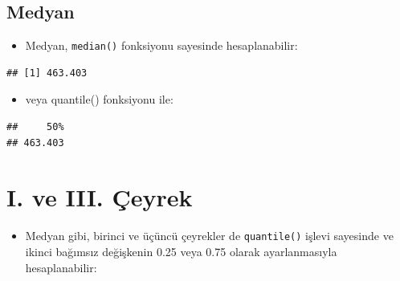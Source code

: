 \documentclass[
  oneside]{book}
\newenvironment{Shaded}{\begin{snugshade}}{\end{snugshade}}
\newcommand{\CommentTok}[1]{\textcolor[rgb]{0.56,0.35,0.01}{\textit{#1}}}
\newcommand{\FloatTok}[1]{\textcolor[rgb]{0.00,0.00,0.81}{#1}}
\newcommand{\FunctionTok}[1]{\textcolor[rgb]{0.13,0.29,0.53}{\textbf{#1}}}
\newcommand{\NormalTok}[1]{#1}
\newcommand{\SpecialCharTok}[1]{\textcolor[rgb]{0.81,0.36,0.00}{\textbf{#1}}}
\providecommand{\tightlist}{%
  \setlength{\itemsep}{0pt}\setlength{\parskip}{0pt}}
\begin{document}
\hypertarget{medyan}{%
\subsection{Medyan}\label{medyan}}

\begin{itemize}
\tightlist
\item
  Medyan, \texttt{median()} fonksiyonu sayesinde hesaplanabilir:
\end{itemize}

\begin{Shaded}
\end{Shaded}

\begin{verbatim}
## [1] 463.403
\end{verbatim}

\begin{itemize}
\tightlist
\item
  veya quantile() fonksiyonu ile:
\end{itemize}

\begin{Shaded}
\end{Shaded}

\begin{verbatim}
##     50% 
## 463.403
\end{verbatim}

\hypertarget{i.-ve-iii.-uxe7eyrek}{%
\section{I. ve III. Çeyrek}\label{i.-ve-iii.-uxe7eyrek}}

\begin{itemize}
\tightlist
\item
  Medyan gibi, birinci ve üçüncü çeyrekler de \texttt{quantile()} işlevi sayesinde ve ikinci bağımsız değişkenin 0.25 veya 0.75 olarak ayarlanmasıyla hesaplanabilir:
\end{itemize}

\begin{Shaded}
\end{Shaded}
\end{document}
